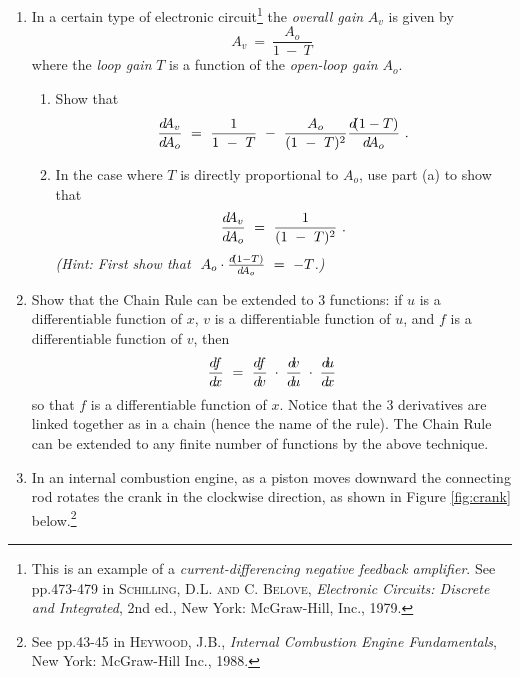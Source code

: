 {\begin{enumerate}[item-label={\bfseries \arabic*.}]
[item-label={{[\bfseries \arabic*.]}}]
 \item In a certain type of electronic circuit\footnote{This is an example of a
  \emph{current-differencing negative feedback amplifier}. See pp.473-479 in
  \textsc{Schilling, D.L. and C. Belove}, \emph{Electronic Circuits: Discrete and Integrated},
  2nd ed., New York: McGraw-Hill, Inc., 1979.} the \emph{overall gain} $A_v$ is given by
  \begin{displaymath}
   A_v ~=~ \frac{A_o}{1 ~-~ T}
  \end{displaymath}
  where the \emph{loop gain} $T$ is a function of the \emph{open-loop gain} $A_o$.
  \begin{enumerate}[item-label={\bfseries (\alph*)}]
   \item Show that
    \begin{displaymath}
     \frac{d \negmedspace A_v}{d\!A_o} ~=~ \frac{1}{1 ~-~ T} ~-~ \frac{A_o}{(1 ~-~ T)^2}
                                           \frac{d \negmedspace (1 - T)}{d\!A_o} ~.
    \end{displaymath}
   \item In the case where $T$ is directly proportional to $A_o$, use part (a) to
    show that
    \begin{displaymath}
     \frac{d \negmedspace A_v}{d\!A_o} ~=~ \frac{1}{(1 ~-~ T)^2} ~.
    \end{displaymath}
    \emph{(Hint: First show that $\;A_o \cdot \frac{d \negmedspace (1 - T)}{d\!A_o} ~=~ -T$.)}
  \end{enumerate}
 \item Show that the Chain Rule can be extended to 3 functions: if $u$ is a
  differentiable function of $x$, $v$ is a differentiable function of $u$, and
  $f$ is a differentiable function of $v$, then
\begin{displaymath}
 \dfdx ~=~ \dfdv \;\cdot\; \dvdu \;\cdot\; \dudx
\end{displaymath}
so that $f$ is a differentiable function of $x$. Notice that the 3 derivatives
are linked together as in a chain (hence the name of the rule). The Chain Rule
can be extended to any finite number of functions by the above technique.
\newpage
 \item In an internal combustion engine, as a piston moves downward the connecting rod
 rotates the crank in the clockwise direction, as shown in Figure \ref{fig:crank}
below.\footnote{See pp.43-45 in \textsc{Heywood, J.B.}, \emph{Internal Combustion Engine
Fundamentals}, New York: McGraw-Hill Inc., 1988.}


\end{enumerate}}
